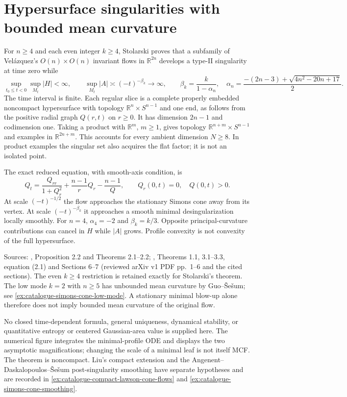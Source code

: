 \chapter{Hypersurface singularities with bounded mean curvature}\label{sec:catalogue-bounded-mean-curvature-singularities}
\begin{example}\label{ex:catalogue-bounded-mean-curvature-singularities}
For $n\geq4$ and each even integer $k\geq4$, Stolarski proves that a subfamily of Vel\'azquez's $O(n)\times O(n)$ invariant flows in $\mathbb R^{2n}$ develops a type-II singularity at time zero while
\[
 \sup_{t_0\leq t<0}\sup_{M_t}|H|<\infty,
 \qquad \sup_{M_t}|A|\asymp(-t)^{-\beta_k}\longrightarrow\infty,
 \qquad \beta_k=\frac{k}{1-\alpha_n},\quad
 \alpha_n=\frac{-(2n-3)+\sqrt{4n^2-20n+17}}2.
\]
The time interval is finite. Each regular slice is a complete properly embedded noncompact hypersurface with topology $\mathbb R^n\times S^{n-1}$ and one end, as follows from the positive radial graph $Q(r,t)$ on $r\geq0$. It has dimension $2n-1$ and codimension one. Taking a product with $\mathbb R^m$, $m\geq1$, gives topology $\mathbb R^{n+m}\times S^{n-1}$ and examples in $\mathbb R^{2n+m}$. This accounts for every ambient dimension $N\geq8$. In product examples the singular set also acquires the flat factor; it is not an isolated point.

The exact reduced equation, with smooth-axis condition, is
\[
 Q_t=\frac{Q_{rr}}{1+Q_r^2}+\frac{n-1}{r}Q_r-\frac{n-1}{Q},
 \qquad Q_r(0,t)=0,\quad Q(0,t)>0.
\]
At scale $(-t)^{-1/2}$ the flow approaches the stationary Simons cone away from its vertex. At scale $(-t)^{-\beta_k}$ it approaches a smooth minimal desingularization locally smoothly. For $n=4$, $\alpha_4=-2$ and $\beta_k=k/3$. Opposite principal-curvature contributions can cancel in $H$ while $|A|$ grows. Profile convexity is not convexity of the full hypersurface.

Sources: \cite{CatVelazquez1994}, Proposition 2.2 and Theorems 2.1--2.2; \cite{CatStolarski2023}, Theorems 1.1, 3.1--3.3, equation (2.1) and Sections 6--7 (reviewed arXiv v1 PDF pp.~1--6 and the cited sections). The even $k\geq4$ restriction is retained exactly for Stolarski's theorem. The low mode $k=2$ with $n\geq5$ has unbounded mean curvature by Guo--\v Se\v sum; see \ref{ex:catalogue-simons-cone-low-mode}. A stationary minimal blow-up alone therefore does not imply bounded mean curvature of the original flow.

No closed time-dependent formula, general uniqueness, dynamical stability, or quantitative entropy or centered Gaussian-area value is supplied here. The numerical figure integrates the minimal-profile ODE and displays the two asymptotic magnifications; changing the scale of a minimal leaf is not itself MCF. The theorem is noncompact. Liu's compact extension and the Angenent--Daskalopoulos--\v Se\v sum post-singularity smoothing have separate hypotheses and are recorded in \ref{ex:catalogue-compact-lawson-cone-flows} and \ref{ex:catalogue-simons-cone-smoothing}.
\end{example}

